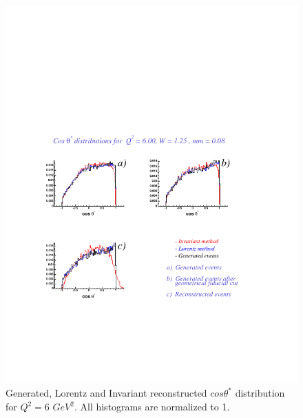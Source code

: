 \begin{figure}[h]
    \begin{center}
        \includegraphics[width = 12cm, bb = 60 140 540 540]{appendix/img/ctheta_q26.00_W1.25_mm0.08}
        \caption{Generated, Lorentz and Invariant reconstructed $cos\theta^*$ distribution for $Q^2=6$ $GeV^2$.
        All histograms are normalized to 1.}
    \end{center}
\end{figure} 
